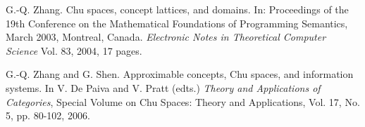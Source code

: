 \documentclass{LMCS}
\begin{document}
\begin{thebibliography}{10}
G.-Q. Zhang. Chu spaces, concept lattices, and  domains. 
In: Proceedings of the 19th Conference on the Mathematical Foundations of
Programming Semantics, March 2003, Montreal, Canada. {\em Electronic Notes
in Theoretical Computer Science} Vol. 83, 2004, 17 pages. 

G.-Q. Zhang and G. Shen. 
Approximable concepts, Chu spaces, and information systems. 
In V. De Paiva and V. Pratt (edts.) 
{\em  Theory and Applications of Categories},
Special Volume on Chu Spaces: Theory and Applications, Vol. 17, No. 5, pp. 80-102, 2006. 
\end{thebibliography}
\end{document}
